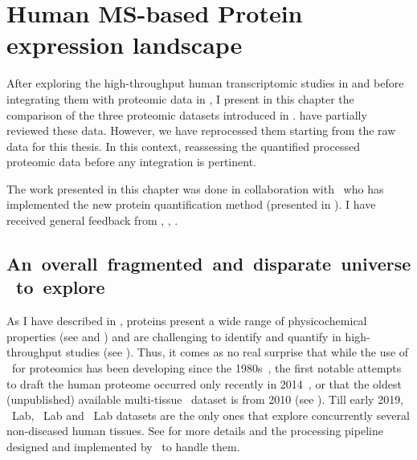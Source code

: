 \chapter{Human MS-based Protein expression landscape}\label{ch:proteomics}

\setlength{\epigraphwidth}{0.7\textwidth}
    \setlength{\epigraphrule}{0pt}

After exploring the high-throughput human transcriptomic studies
in 
and before integrating them with proteomic data in ,
I present in this chapter the comparison of
the three proteomic datasets introduced in .
\citet{Ezkurdia2014-qx,Deutsch2015} have partially reviewed these data.
However, we have reprocessed them starting from the raw data
for this thesis.
In this context, reassessing the quantified processed proteomic data
before any integration is pertinent.\mybr\

The work presented in this chapter was done in collaboration with \james\
who has implemented the new protein quantification method
(presented in ).
I have received general feedback from \alvis, \mar,
\sarah{}.\mybr\

\section{An~overall~fragmented~and~disparate~universe~to~explore}

As I have described in ,
proteins present a wide range of physicochemical properties
(see  and )
and are challenging to identify and quantify
in high-throughput studies (see ).
Thus, it comes as no real surprise that
while the use of \ms\ for proteomics has been developing since the 1980s~,
the first notable attempts to draft the human proteome occurred only recently
in 2014~\mycite{PandeyData,KusterData},
or that the oldest (unpublished) available multi-tissue \cutler\ dataset is from 2010
(see \Cref{subsec:cutler}).
Till early 2019,
\cutler\ Lab, \kuster\ Lab and \pandey\ Lab datasets are the only ones
that explore concurrently several non-diseased human tissues.
See  for more details and
the processing pipeline designed and implemented by \james\ to handle them.\mybr\

